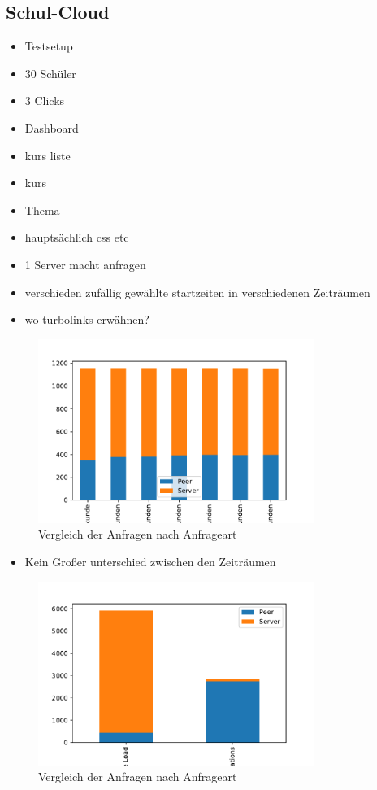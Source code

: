 \subsection{Schul-Cloud}

\begin{itemize}
	\item Testsetup
	\item 30 Schüler
	\item 3 Clicks
	\item Dashboard
	\item kurs liste
	\item kurs
	\item Thema
	\item hauptsächlich css etc
	\item 1 Server macht anfragen
	\item verschieden zufällig gewählte startzeiten in verschiedenen Zeiträumen
	\item wo turbolinks erwähnen?
\end{itemize}
\begin{figure}[!h]
	\centering
	\includegraphics[width=0.8\textwidth]{figures/sc_stacked_interval}
	\caption[A Figure Short-Title]{Vergleich der Anfragen nach Anfrageart}
	\label{fig:15_clients_network}
\end{figure}

\begin{itemize}
	\item Kein Großer unterschied zwischen den Zeiträumen
\end{itemize}

\begin{figure}[!h]
	\centering
	\includegraphics[width=0.8\textwidth]{figures/sc_first_vs_later}
	\caption[A Figure Short-Title]{Vergleich der Anfragen nach Anfrageart}
	\label{fig:15_clients_network}
\end{figure}

